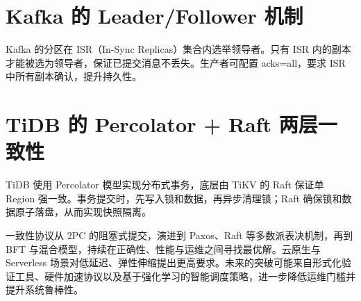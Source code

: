 \section{Kafka 的 Leader/Follower 机制}
Kafka 的分区在 ISR（In-Sync Replicas）集合内选举领导者。只有 ISR 内的副本才能被选为领导者，保证已提交消息不丢失。生产者可配置 acks=all，要求 ISR 中所有副本确认，提升持久性。\par
\section{TiDB 的 Percolator + Raft 两层一致性}
TiDB 使用 Percolator 模型实现分布式事务，底层由 TiKV 的 Raft 保证单 Region 强一致。事务提交时，先写入锁和数据，再异步清理锁；Raft 确保锁和数据原子落盘，从而实现快照隔离。\par
一致性协议从 2PC 的阻塞式提交，演进到 Paxos、Raft 等多数派表决机制，再到 BFT 与混合模型，持续在正确性、性能与运维之间寻找最优解。云原生与 Serverless 场景对低延迟、弹性伸缩提出更高要求。未来的突破可能来自形式化验证工具、硬件加速协议以及基于强化学习的智能调度策略，进一步降低运维门槛并提升系统鲁棒性。\par

